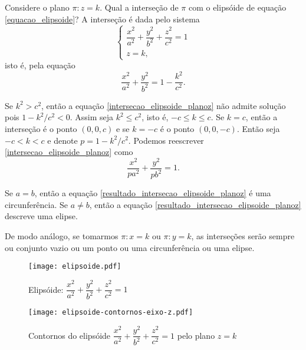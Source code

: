 Considere o plano $\pi: z = k$. Qual a interse\c{c}\~ao de $\pi$ com o elips\'oide de equa\c{c}\~ao \eqref{equacao_elipsoide}? A interse\c{c}\~ao \'e dada pelo sistema
\[
	\begin{cases}
		\dfrac{x^2}{a^2} + \dfrac{y^2}{b^2} + \dfrac{z^2}{c^2} = 1\\
		z = k,
	\end{cases}
\]
isto \'e, pela equa\c{c}\~ao
\begin{equation}\label{intersecao_elipsoide_planoz}
	\dfrac{x^2}{a^2} + \dfrac{y^2}{b^2} = 1 - \dfrac{k^2}{c^2}.
\end{equation}

Se $k^2 > c^2$, ent\~ao a equa\c{c}\~ao \eqref{intersecao_elipsoide_planoz} n\~ao admite solu\c{c}\~ao pois $1 - k^2/c^2 < 0$. Assim seja $k^2 \le c^2$, isto \'e, $-c \le k \le c$. Se $k = c$, ent\~ao a interse\c{c}\~ao \'e o ponto $(0,0,c)$ e se $k = -c$ \'e o ponto $(0,0,-c)$. Ent\~ao seja $-c < k < c$ e denote $p = 1 - k^2/c^2$. Podemos reescrever \eqref{intersecao_elipsoide_planoz} como
\begin{equation}\label{resultado_intersecao_elipsoide_planoz}
	\dfrac{x^2}{pa^2} + \dfrac{y^2}{pb^2} = 1.
\end{equation}

Se $a = b$, ent\~ao a equa\c{c}\~ao \eqref{resultado_intersecao_elipsoide_planoz} \'e uma circunfer\^encia. Se $a \ne b$, ent\~ao a equa\c{c}\~ao \eqref{resultado_intersecao_elipsoide_planoz} descreve uma elipse.

De modo an\'alogo, se tomarmos $\pi : x = k$ ou $\pi : y = k$, as interse\c{c}\~oes ser\~ao sempre ou conjunto vazio ou um ponto ou uma circunfer\^encia ou uma elipse.
\begin{figure}[h]
	\centering
	\caption{Elips\'oide: $\dfrac{x^2}{a^2} + \dfrac{y^2}{b^2} + \dfrac{z^2}{c^2} = 1$}
	\texttt{[image: elipsoide.pdf]}
\end{figure}

\begin{figure}[!h]
	\centering
	\caption{Contornos do elips\'oide $\dfrac{x^2}{a^2} + \dfrac{y^2}{b^2} + \dfrac{z^2}{c^2} = 1$ pelo plano $z = k$}
	\hspace*{-2cm}
	\texttt{[image: elipsoide-contornos-eixo-z.pdf]}
\end{figure}


